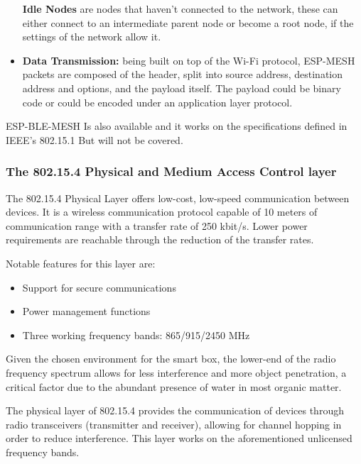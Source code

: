 \documentclass[11pt]{article}
\begin{document}
\begin{itemize}
    \textbf{Idle Nodes} are nodes that haven't connected to the network, these can either connect to an intermediate parent node or become a root node, if the settings of the network allow it. \par \vspace{0.2 cm}
    \item \textbf{Data Transmission:} being built on top of the Wi-Fi protocol, ESP-MESH packets are composed of the header, split into source address, destination address and options, and the payload itself. The payload could be binary code or could be encoded under an application layer protocol. 
\end{itemize}

ESP-BLE-MESH Is also available and it works on the specifications defined in IEEE's 802.15.1 But will not be covered.

\subsubsection{The 802.15.4 Physical and Medium Access Control layer}

The 802.15.4 Physical Layer offers low-cost, low-speed communication between devices. It is a wireless communication protocol capable of 10 meters of communication range with a transfer rate of 250 kbit/s. Lower power requirements are reachable through the reduction of the transfer rates. \par
\vspace{0.5 cm}

Notable features for this layer are:
\begin{itemize}
    \item Support for secure communications
    \item Power management functions
    \item Three working frequency bands: 865/915/2450 MHz
\end{itemize}

Given the chosen environment for the smart box, the lower-end of the radio frequency spectrum allows for less interference and more object penetration, a critical factor due to the abundant presence of water in most organic matter. \par
\vspace{0.5 cm}

The physical layer of 802.15.4 provides the communication of devices through radio transceivers (transmitter and receiver), allowing for channel hopping in order to reduce interference. This layer works on the aforementioned unlicensed frequency bands. 
\par
\vspace{0.5 cm}
\end{document}
